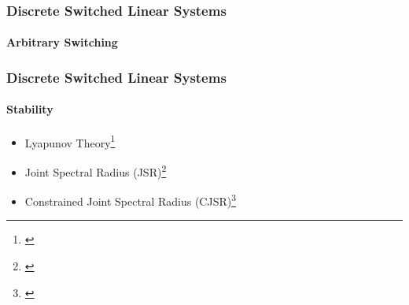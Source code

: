 \begin{frame}
    \frametitle{Discrete Switched Linear Systems}%
    \framesubtitle{Arbitrary Switching}%
    \begin{figure}[h]
        \centering
        \only<2>{}%
        \only<3>{}%
    \end{figure}
\end{frame}


\begin{frame}
    \frametitle{Discrete Switched Linear Systems}
    \framesubtitle{Stability}
    \begin{itemize}\setlength\itemsep{1em}
        \item Lyapunov Theory\footnote{\cite{Liberzon:2003, Linsenmayer:2021, Hertneck:2021}}
        \item Joint Spectral Radius (JSR)\footnote{\cite{Maggio:2020, Ogura:2013}}
        \item Constrained Joint Spectral Radius (CJSR)\footnote{\cite{Dai:2012}}
    \end{itemize}
\end{frame}


